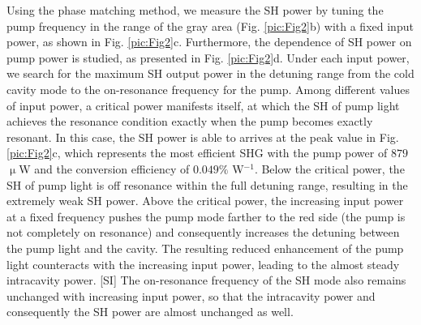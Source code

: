 \documentclass[a4paper,8pt,hyperref, twocolumn]{article}
\begin{document}


Using the phase matching method, we measure the SH power by tuning the pump frequency in the range of the gray area (Fig. \ref{pic:Fig2}b) with a fixed input power, as shown in Fig. \ref{pic:Fig2}c.%
Furthermore, the dependence of SH power on pump power is studied, as presented in Fig. \ref{pic:Fig2}d. 
Under each input power, we search for the maximum SH output power in the detuning range from the cold cavity mode to the on-resonance frequency for the pump. 
Among different values of input power, a critical power manifests itself, at which the SH of pump light achieves the resonance condition exactly when the pump becomes exactly resonant. %
In this case, the SH power is able to arrives at the peak value in Fig. \ref{pic:Fig2}c, which represents the most efficient SHG with the pump power of $879$ $\upmu$W and the conversion efficiency of $0.049\%$ W$^{-1}$.
Below the critical power, the SH of pump light is off resonance within the full detuning range, resulting in the extremely weak SH power.
Above the critical power, the increasing input power at a fixed frequency pushes the pump mode farther to the red side (the pump is not completely on resonance) and consequently increases the detuning between the pump light and the cavity.
The resulting reduced enhancement of the pump light counteracts with the increasing input power, leading to the almost steady intracavity power. [SI]
The on-resonance frequency of the SH mode also remains unchanged with increasing input power, so that the intracavity power and consequently the SH power are almost unchanged as well. %
\end{document}

